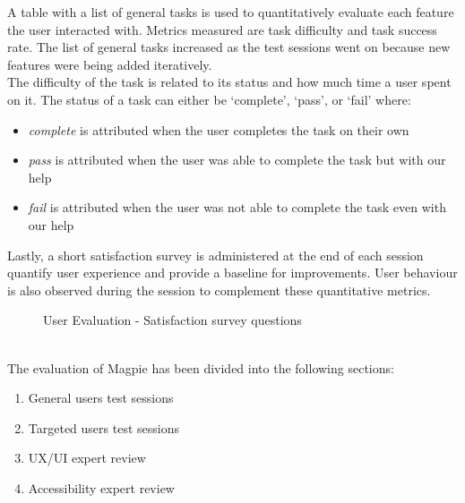 \noindent A table with a list of general tasks is used to quantitatively evaluate each feature the user interacted with. Metrics measured are task difficulty and task success rate. The list of general tasks increased as the test sessions went on because new features were being added iteratively.\\
The difficulty of the task is related to its status and how much time a user spent on it. The status of a task can either be `complete', `pass', or `fail' where:
\begin{itemize}
    \item \emph{complete} is attributed when the user completes the task on their own
    \item \emph{pass} is attributed when the user was able to complete the task but with our help
    \item \emph{fail} is attributed when the user was not able to complete the task even with our help
\end{itemize}
Lastly, a short satisfaction survey is administered at the end of each session quantify user experience and provide a baseline for improvements. User behaviour is also observed during the session to complement these quantitative metrics.\\
\begin{figure}[h!]
    \centering
    \caption{User Evaluation - Satisfaction survey questions}
\end{figure}\\
The evaluation of Magpie has been divided into the following sections:
\begin{enumerate}
    \item General users test sessions
    \item Targeted users test sessions
    \item UX/UI expert review
    \item Accessibility expert review
\end{enumerate}
